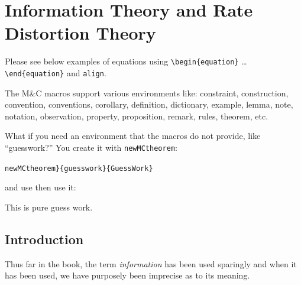 \documentclass{book}\usepackage[]{graphicx}\usepackage[]{color}
\begin{document}
 \frontmatter                   %

 \mainmatter                    %
    


\chapter{Information Theory and Rate Distortion Theory}
\label{ch01}


Please see below examples of equations using \verb+\begin{equation}+ \ldots
\verb+\end{equation}+ and \verb+align+.

The M\&C macros support various environments like:
constraint, construction, 
convention, conventions, corollary, definition, dictionary,
example, lemma, note, notation, observation, property, proposition,
remark, rules, theorem, etc.

What if you need an environment that the macros do not provide,
like ``guesswork?'' You create it with \verb+newMCtheorem+:

\verb+newMCtheorem}{guesswork}{GuessWork}+


\noindent
and use then use it:
\begin{guesswork}
This is pure guess work.
\end{guesswork}


\section{Introduction}
\label{ch01.sec1}

Thus far in the book, the term \textit{information}
%
has been used sparingly and when
it has been used, we have purposely been imprecise as to its meaning.
\end{document}

